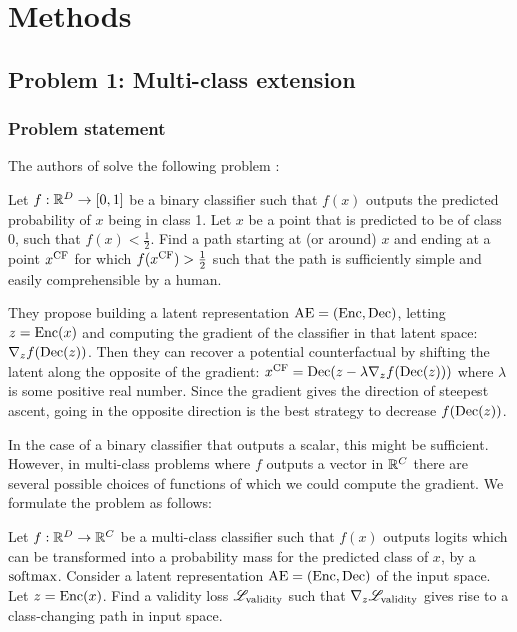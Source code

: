 \documentclass[../main.tex]{subfiles}
\begin{document}
\chapter{Methods}
\label{ch:methods}

\section{Problem 1: Multi-class extension}

\subsection{Problem statement}

The authors of \ls{} solve the following problem \cite{cohenGifsplanation2022}:

Let $f: \mathbb{R}^D \to [0, 1]$ be a binary classifier such that $f(x)$ outputs the predicted probability of $x$ being in class 1.
Let $x$ be a point that is predicted to be of class 0, \ie{} such that $f(x) < \frac{1}{2}$.
Find a path starting at (or around) $x$ and ending at a point $x^\text{CF}$ for which $f(x^\text{CF}) > \frac{1}{2}$ such that the path is sufficiently simple and easily comprehensible by a human.

They propose building a latent representation $\mathrm{AE} = (\operatorname{Enc}, \operatorname{Dec})$, letting $z = \operatorname{Enc}(x)$ and computing the gradient of the classifier in that latent space:
$\nabla_z f(\operatorname{Dec}(z))$.
Then they can recover a potential counterfactual by shifting the latent along the opposite of the gradient: $x^\text{CF} = \operatorname{Dec}(z - \lambda \nabla_z f(\operatorname{Dec}(z)))$ where $\lambda$ is some positive real number.
Since the gradient gives the direction of steepest ascent, going in the opposite direction is the best strategy to decrease $f(\operatorname{Dec}(z))$.

In the case of a binary classifier that outputs a scalar, this might be sufficient. However, in multi-class problems where $f$ outputs a vector in $\mathbb{R}^C$ there are several possible choices of functions of which we could compute the gradient.
We formulate the problem as follows:

Let $f: \mathbb{R}^D \to \mathbb{R}^C$ be a multi-class classifier such that $f(x)$ outputs logits which can be transformed into a probability mass for the predicted class of $x$, \eg{} by a $\text{softmax}$.
Consider a latent representation $\mathrm{AE} = (\operatorname{Enc}, \operatorname{Dec})$ of the input space. 
Let $z = \operatorname{Enc}(x)$.
Find a validity loss $\mathscr{L}_\text{validity}$ such that
$\nabla_z \mathscr{L}_\text{validity}$ gives rise to a class-changing path in input space.
\end{document}
